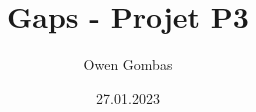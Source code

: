 \documentclass[french,a4paper,11pt]{report}
\title{Gaps - Projet P3}
\author{Owen Gombas}
\date{27.01.2023}
\begin{document}
\maketitle
\tableofcontents{}





\end{document}
